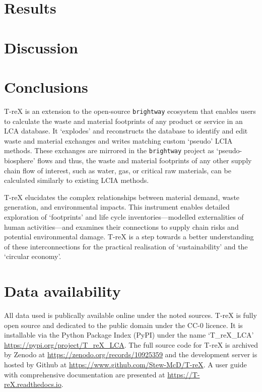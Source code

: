 \documentclass[review,3p,authoryear]{elsarticle}
\renewcommand{\texttt}[1]{{\ttfamily\small\nolinkurl{#1}}}
\begin{document}
\section{Results}\label{sec:results}


\section{Discussion}\label{sec:discussion}


\section{Conclusions}\label{sec:conclusions}

T-reX is an extension to the open-source \texttt{brightway} ecosystem that enables users to calculate the waste and material footprints of any product or service in an LCA database. It `explodes' and reconstructs the database to identify and edit waste and material exchanges and writes matching custom `pseudo' LCIA methods. These exchanges are mirrored in the \texttt{brightway} project as `pseudo-biosphere' flows and thus, the waste and material footprints of any other supply chain flow of interest, such as water, gas, or critical raw materials, can be calculated similarly to existing LCIA methods.

T-reX elucidates the complex relationships between material demand, waste generation, and environmental impacts. This instrument enables detailed exploration of `footprints' and life cycle inventories---modelled externalities of human activities---and examines their connections to supply chain risks and potential environmental damage. T-reX is a step towards a better understanding of these interconnections for the practical realisation of `sustainability' and the `circular economy'.

\section*{Data availability}
All data used is publically available online under the noted sources. T-reX is fully open source and dedicated to the public domain under the CC-0 licence. It is installable via the Python Package Index (PyPI) under the name `T\_reX\_LCA' \url{https://pypi.org/project/T_reX_LCA}.
The full source code for T-reX is archived by Zenodo at \url{https://zenodo.org/records/10925359} and the development server is hosted by Github at \url{https://www.github.com/Stew-McD/T-reX}. A user guide with comprehensive documentation are presented at \url{https://T-reX.readthedocs.io}.
\end{document}
